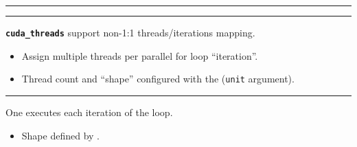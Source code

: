 \newpage
{}

{\large

}

\vspace{3mm}
\hrule

\begin{center}
\begin{tikzpicture}[node distance=2mm]

\end{tikzpicture}
\end{center}

\newpage
{}

{\large

}





\newpage
{}

{\large

}

\vspace{3mm}
\hrule

{\LARGE
\texttt{\textbf{cuda\_threads}} support non-1:1 threads/iterations mapping.
\begin{itemize}
  \item Assign multiple threads per parallel for loop ``iteration''.
  \item Thread count and ``shape'' configured with the  (\texttt{unit} argument).
\end{itemize}

}

\newpage
{}

{\large

}

\vspace{3mm}
\hrule

{\LARGE

One  executes each iteration of the loop.
\begin{itemize}
  \item Shape defined by .
\end{itemize}

}

